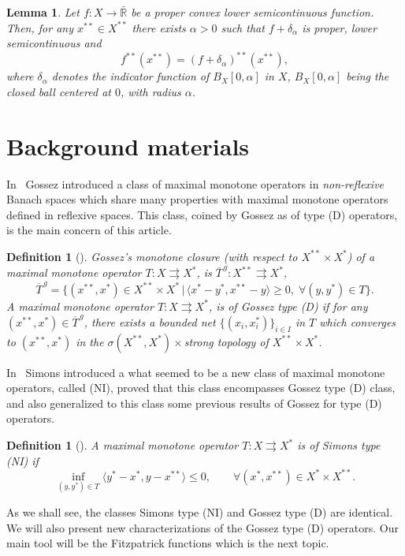 \documentclass[11pt]{article}
\newcommand{\BR}{\bar{\mathbb{R}}}
\newcommand{\inner}[2]{\langle{#1},{#2}\rangle}
\newcommand{\tos}{\rightrightarrows} %
\newtheorem{lemma}[theorem]{Lemma}
\newtheorem{definition}[theorem]{Definition}
\begin{document}
\begin{lemma}\label{lm:roc}
  Let $f:X\to\BR$ be a proper convex lower semicontinuous function.
  Then, for any $x^{**}\in X^{**}$ there exists $\alpha>0$ such
  that $f+\delta_\alpha$ is proper, lower semicontinuous and
 \[ f^{**}(x^{**})=(f+\delta_\alpha)^{**}(x^{**}),
 \]
 where $\delta_\alpha$ denotes the indicator function of
 $B_{X}[0,\alpha]$ in $X$,  $B_X[0,\alpha]$ being  the closed ball
   centered at $0$, with radius $\alpha$.
\end{lemma}
%





\section{Background materials}

In~\cite{gos-ope.jmaa71} Gossez introduced a class of maximal monotone operators in
\emph{non-reflexive} Banach spaces which share many properties with
maximal monotone operators defined in reflexive spaces.
%
This class, coined by Gossez as of type (D) operators, is the 
main concern of  this article.
%
\begin{definition}[\cite{gos-ope.jmaa71}]
Gossez's  monotone closure (with respect
to $X^{**}\times X^*$) of a maximal monotone operator $T:X\tos X^*$,
is $\overline T^{\,g}:X^{**}\tos X^*$,
\begin{equation}
  \label{eq:mc}
 \overline T^{\,g}=\{(x^{**},x^*)\in X^{**}\times X^* \,|\,
\inner{x^*-y^*}{x^{**}-y}\geq 0,\;\forall (y,y^*)\in T\}. 
\end{equation}
A maximal monotone operator $T:X\tos X^*$, is of Gossez type (D) if
for any $(x^{**},x^*)\in \overline T^{\,g}$, there exists a \emph{bounded}
net $\{(x_i,x_i^*)\}_{i\in I}$ in $T$ which 
converges to $(x^{**},x^*)$ in the $\sigma(X^{**},X^*)\times$strong
topology of $X^{**}\times X^*$.
\end{definition}
%
In~\cite{sim-ran.jmaa96} Simons introduced a what seemed to be a new
class of maximal monotone operators, called (NI), proved that this 
class encompasses Gossez type (D) class, and also generalized to this
class some previous results of Gossez for type (D) operators.
\begin{definition}[\cite{sim-ran.jmaa96}]
  \label{def:ni} A maximal monotone
  operator $T:X\tos X^*$ is of Simons type \emph{(NI)} if
  \[ \inf_{(y,y^{*})\in T}  \inner{y^*-x^*}{y-x^{**}}\leq 0,\qquad
   \forall (x^*,x^{**})\in X^*\times X^{**}.
   \]
\end{definition}
%
As we shall see, the classes Simons type (NI) and Gossez type (D) are identical.
%
We will also present new characterizations of the Gossez type (D)
operators.  Our main tool will be the Fitzpatrick functions which is
the next topic.
\end{document}
